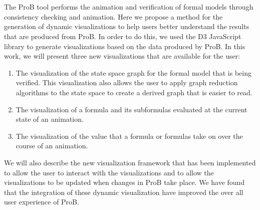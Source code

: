 \section*{}

The ProB tool performs the animation and verification of formal models  through consistency checking and animation. Here we propose a method for the generation of dynamic visualizations to help users better understand the results that are produced from ProB. In order to do this, we used the D3 JavaScript library to generate visualizations based on the data produced by ProB. In this work, we will present three new visualizations that are available for the user:

\begin{enumerate}
	\item The visualization of the state space graph for the formal model that is being verified. This visualization also allows the user to apply graph reduction algorithms to the state space to create a derived graph that is easier to read. 
	\item The visualization of a formula and its subformulas evaluated at the current state of an animation.
	\item The visualization of the value that a formula or formulas take on over the course of an animation.
\end{enumerate}

We will also describe the new visualization framework that has been implemented to allow the user to interact with the visualizations and to allow the visualizations to be updated when changes in ProB take place. We have found that the integration of these dynamic visualization have improved the over all user experience of ProB.